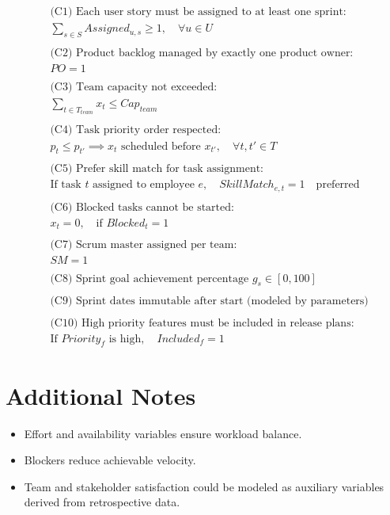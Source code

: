 \documentclass{article}
\begin{document}
\begin{align}
    & \text{(C1) Each user story must be assigned to at least one sprint:} \\
    & \sum_{s \in S} Assigned_{u,s} \geq 1, \quad \forall u \in U \\
    \\
    & \text{(C2) Product backlog managed by exactly one product owner:} \\
    & PO = 1 \\
    \\
    & \text{(C3) Team capacity not exceeded:} \\
    & \sum_{t \in T_{team}} x_t \leq Cap_{team} \\
    \\
    & \text{(C4) Task priority order respected:} \\
    & p_t \leq p_{t'} \implies x_t \text{ scheduled before } x_{t'}, \quad \forall t,t' \in T \\
    \\
    & \text{(C5) Prefer skill match for task assignment:} \\
    & \text{If task } t \text{ assigned to employee } e, \quad SkillMatch_{e,t} = 1 \quad \text{preferred} \\
    \\
    & \text{(C6) Blocked tasks cannot be started:} \\
    & x_t = 0, \quad \text{if } Blocked_t = 1 \\
    \\
    & \text{(C7) Scrum master assigned per team:} \\
    & SM = 1 \\
    \\
    & \text{(C8) Sprint goal achievement percentage } g_s \in [0, 100] \\
    \\
    & \text{(C9) Sprint dates immutable after start (modeled by parameters)} \\
    \\
    & \text{(C10) High priority features must be included in release plans:} \\
    & \text{If } Priority_f \text{ is high}, \quad Included_f = 1
\end{align}

\section*{Additional Notes}

\begin{itemize}
    \item Effort and availability variables ensure workload balance.
    \item Blockers reduce achievable velocity.
    \item Team and stakeholder satisfaction could be modeled as auxiliary variables derived from retrospective data.
\end{itemize}
\end{document}
